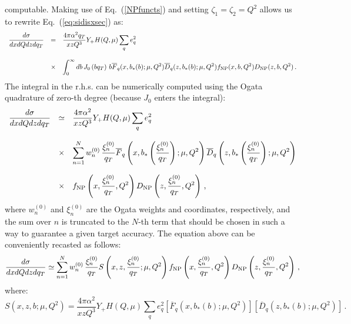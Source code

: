 \documentclass[10pt,a4paper]{article}
\begin{document}
computable. Making use of Eq.~(\ref{NPfuncts}) and setting
$\zeta_1=\zeta_2=Q^2$ allows us to rewrite Eq.~(\ref{eq:sidisxsec})
as:
\begin{equation}\label{eq:sidisxsec3}
\begin{array}{rcl}
\displaystyle   \frac{d\sigma}{dxdQdz d q_{T}} &=&\displaystyle
\frac{4\pi \alpha^2q_{T}}{xzQ^3}Y_+ H(Q,\mu) \sum_q e_q^2\\
\\
&\times&\displaystyle 
  \int_0^\infty db\, J_0\left(bq_T\right) \,b\overline{F}_q(x,b_*(b);\mu,Q^2) \overline{D}_q(z,b_*(b);\mu,Q^2) f_{\rm NP}(x,b,Q^2) D_{\rm NP}(z,b,Q^2)\,.
\end{array}
\end{equation}
The integral in the r.h.s. can be numerically computed using the Ogata
quadrature of zero-th degree (because $J_0$ enters the integral):
\begin{equation}
\begin{array}{rcl}
\displaystyle   \frac{d\sigma}{dxdQdz d q_{T}} &\simeq&\displaystyle
\frac{4\pi \alpha^2}{xzQ^3}Y_+ H(Q,\mu) \sum_q e_q^2\\
\\
&\times&\displaystyle
  \sum_{n=1}^{N}w_n^{(0)}\,\frac{\xi_n^{(0)}}{q_{T}}\overline{F}_q\left(x,b_*\left(\frac{\xi_n^{(0)}}{q_{T}}\right);\mu,Q^2\right)
         \overline{D}_q\left(z,b_*\left(\frac{\xi_n^{(0)}}{q_{T}}\right);\mu,Q^2\right)\\
\\
&\times& \displaystyle f_{\rm NP}\left(x, \frac{\xi_n^{(0)}}{q_{T}},Q^2\right) D_{\rm NP}\left(z, \frac{\xi_n^{(0)}}{q_{T}},Q^2\right)\,,
\end{array}
\end{equation}
where $w_n^{(0)}$ and $\xi_n^{(0)}$ are the Ogata weights and
coordinates, respectively, and the sum over $n$ is truncated to the
$N$-th term that should be chosen in such a way to guarantee a given
target accuracy. The equation above can be conveniently recasted as
follows:
\begin{equation}
\displaystyle \frac{d\sigma}{dxdQdz d q_{T}} \simeq
  \sum_{n=1}^{N}w_n^{(0)}\,\frac{\xi_n^{(0)}}{q_{T}}S\left(x,z,\frac{\xi_n^{(0)}}{q_{T}};\mu,Q^2\right) f_{\rm NP}\left(x, \frac{\xi_n^{(0)}}{q_{T}},Q^2\right) D_{\rm NP}\left(z, \frac{\xi_n^{(0)}}{q_{T}},Q^2\right)\,,
\end{equation}
where:
\begin{equation}\label{eq:Sall}
\displaystyle S\left(x,z,b;\mu,Q^2\right)=
\frac{4\pi \alpha^2}{xzQ^3}Y_+ H(Q,\mu) \sum_q e_q^2 \left[\overline{F}_q\left(x,b_*(b);\mu,Q^2\right)\right]\left[\overline{D}_q\left(z,b_*(b);\mu,Q^2\right)\right]\,.
\end{equation}
\end{document}
